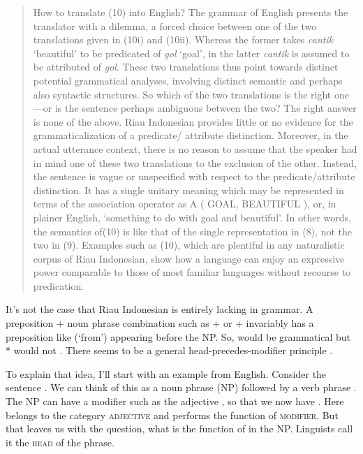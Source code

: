 \begin{quotation}
    How to translate (10) into English? The grammar of English presents the translator with a dilemma, a forced choice between one of the two translations given in (10i) and (10ii). Whereas the former takes \textit{cantik} ‘beautiful’ to be predicated of \textit{gol} ‘goal’, in the latter \textit{cantik} is assumed to be attributed of \textit{gol}. These two translations thus point towards distinct potential grammatical analyses, involving distinct semantic and perhaps also syntactic structures. So which of the two translations is the right one—or is the sentence perhaps ambiguous between the two? The right answer is none of the above. Riau Indonesian provides little or no evidence for the grammaticalization of a predicate/ attribute distinction. Moreover, in the actual utterance context, there is no reason to assume that the speaker had in mind one of these two translations to the exclusion of the other. Instead, the sentence is vague or unspecified with respect to the predicate/attribute distinction. It has a single unitary meaning which may be represented in terms of the association operator as A ( GOAL, BEAUTIFUL ), or, in plainer English, ‘something to do with goal and beautiful’. In other words, the semantics of(10) is like that of the single representation in (8), not the two in (9). Examples such as (10), which are plentiful in any naturalistic corpus of Riau Indonesian, show how a language can enjoy an expressive power comparable to those of most familiar languages without recourse to predication. \hfill\autocite[57]{Gil2014}
\end{quotation}

It's not the case that Riau Indonesian is entirely lacking in grammar. A preposition + noun phrase combination such as  +  or  +  invariably has a preposition like  (`from') appearing before the NP. So,  would be grammatical but * would not \autocite{Gil2000}. %
There seems to be a general head-precedes-modifier principle \autocite{Gil2005}. 

To explain that idea, I'll start with an example from English. Consider the sentence . We can think of this as a noun phrase (NP)  followed by a verb phrase . The NP can have a modifier such as the adjective , so that we now have . Here  belongs to the category \textsc{adjective} and performs the function of \textsc{modifier}. But that leaves us with the question, what is the function of  in the NP. Linguists call it the \textsc{head} of the phrase.

